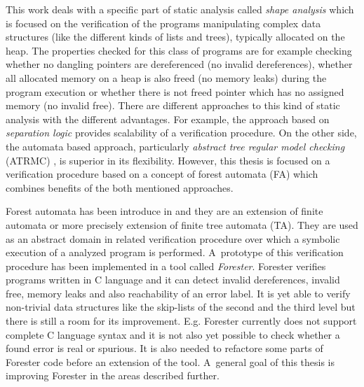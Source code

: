 \documentclass[fleqn,11pt]{ExcelAtFIT} %
\begin{document}
This work deals with a specific part of static analysis called \emph{shape analysis} which is focused on the verification of the programs manipulating
complex data structures (like the different kinds of lists and trees), typically allocated on the heap.
The properties checked for this class of programs are for example checking whether no dangling
pointers are dereferenced (no invalid dereferences), whether all allocated memory on a heap is also freed (no memory leaks)
during the program execution or whether there is not freed pointer which has no assigned memory (no invalid free).
There are different approaches to this kind of static analysis with the different advantages.
For example, the approach based on \emph{separation logic} \cite{seplog,seplog07} provides scalability of a verification procedure.
On the other side, the automata based approach, particularly \emph{abstract tree regular model checking} (ATRMC) \cite{artmc}, is
superior in its flexibility.
However, this thesis is focused on a verification procedure based on a concept of forest automata (FA) which
combines benefits of the both mentioned approaches.

Forest automata has been introduce in \cite{forester11,forester12} and they are an extension of finite automata or more precisely extension of finite tree automata (TA).
They are used as an abstract domain in related verification procedure over which a symbolic execution of a analyzed program is performed.
A~prototype of this verification procedure has been implemented in a tool called \emph{Forester}.
Forester verifies programs written in C language and it can detect invalid dereferences, invalid free, memory leaks and also reachability of an error label.
It is yet able to verify non-trivial data structures like the skip-lists of the second and the third level
but there is still a room for its improvement.
E.g. Forester currently does not support complete C language syntax and
it is not also yet possible to check whether a found error is real or spurious.
It is also needed to refactore some parts of Forester code before an extension of the tool.
A~general goal of this thesis is improving Forester in the areas described further.
\end{document}
